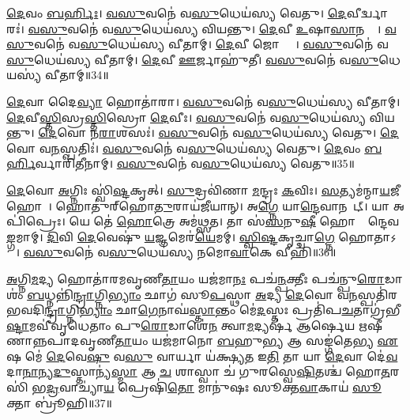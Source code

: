 \ul{𑌦𑍇}𑌵𑌂 \ul{𑌬}\ul{𑌰𑍍}𑌹𑌿𑌃।
\ul{𑌵}\ul{𑌸𑍁}𑌵𑌨𑍇॑ 𑌵\ul{𑌸𑍁}𑌧𑍇𑌯॑𑌸𑍍𑌯 𑌵𑍇𑌤𑍁।
\ul{𑌦𑍇}𑌵𑍀𑌰𑍍𑌦𑍍𑌵𑌾𑌰𑌃॑।
\ul{𑌵}\ul{𑌸𑍁}𑌵𑌨𑍇॑ 𑌵\ul{𑌸𑍁}𑌧𑍇𑌯॑𑌸𑍍𑌯 𑌵𑌿𑌯𑌨𑍍𑌤𑍁।
\ul{𑌦𑍇}𑌵𑍀 \ul{𑌉}𑌷𑌾\ul{𑌸𑌾}𑌨𑌕𑍍𑌤𑌾᳚।
\ul{𑌵}\ul{𑌸𑍁}𑌵𑌨𑍇॑ 𑌵\ul{𑌸𑍁}𑌧𑍇𑌯॑𑌸𑍍𑌯 𑌵𑍀𑌤𑌾𑌮𑍍।
\ul{𑌦𑍇}𑌵𑍀 𑌜𑍋𑌷𑍍𑌟𑍍𑌰𑍀᳚।
\ul{𑌵}\ul{𑌸𑍁}𑌵𑌨𑍇॑ 𑌵\ul{𑌸𑍁}𑌧𑍇𑌯॑𑌸𑍍𑌯 𑌵𑍀𑌤𑌾𑌮𑍍।
\ul{𑌦𑍇}𑌵𑍀 \ul{𑌊}𑌰𑍍𑌜𑌾𑌹𑍁॑𑌤𑍀।
\ul{𑌵}\ul{𑌸𑍁}𑌵𑌨𑍇॑ 𑌵\ul{𑌸𑍁}𑌧𑍇𑌯𑌸𑍍𑌯॑ 𑌵𑍀𑌤𑌾𑌮𑍍॥34॥

\ul{𑌦𑍇}𑌵𑌾 𑌦𑍈\ul{𑌵𑍍𑌯𑌾} 𑌹𑍋𑌤𑌾॑𑌰𑌾।
\ul{𑌵}\ul{𑌸𑍁}𑌵𑌨𑍇॑ 𑌵\ul{𑌸𑍁}𑌧𑍇𑌯॑𑌸𑍍𑌯 𑌵𑍀𑌤𑌾𑌮𑍍।
\ul{𑌦𑍇}𑌵𑍀\ul{𑌸𑍍𑌤𑌿}𑌸𑍍𑌰\ul{𑌸𑍍𑌤𑌿}𑌸𑍍𑌰𑍋 \ul{𑌦𑍇}𑌵𑍀𑌃।
\ul{𑌵}\ul{𑌸𑍁}𑌵𑌨𑍇॑ 𑌵\ul{𑌸𑍁}𑌧𑍇𑌯॑𑌸𑍍𑌯 𑌵𑌿𑌯𑌨𑍍𑌤𑍁।
\ul{𑌦𑍇}𑌵𑍋 𑌨\ul{𑌰𑌾}𑌶𑌸𑌃॑।
\ul{𑌵}\ul{𑌸𑍁}𑌵𑌨𑍇॑ 𑌵\ul{𑌸𑍁}𑌧𑍇𑌯॑𑌸𑍍𑌯 𑌵𑍇𑌤𑍁।
\ul{𑌦𑍇}𑌵𑍋 𑌵\ul{𑌨}𑌸𑍍𑌪𑌤𑌿𑌃॑।
\ul{𑌵}\ul{𑌸𑍁}𑌵𑌨𑍇॑ 𑌵\ul{𑌸𑍁}𑌧𑍇𑌯॑𑌸𑍍𑌯 𑌵𑍇𑌤𑍁।
\ul{𑌦𑍇}𑌵𑌂 \ul{𑌬}\ul{𑌰𑍍}𑌹𑌿𑌰𑍍𑌵𑌾𑌰𑌿॑𑌤𑍀𑌨𑌾𑌮𑍍।
\ul{𑌵}\ul{𑌸𑍁}𑌵𑌨𑍇॑ 𑌵\ul{𑌸𑍁}𑌧𑍇𑌯॑𑌸𑍍𑌯 𑌵𑍇𑌤𑍁॥35॥

\ul{𑌦𑍇}𑌵𑍋 \ul{𑌅}𑌗𑍍𑌨𑌿𑌃 𑌸𑍍𑌵𑌿॑\ul{𑌷𑍍𑌟}𑌕𑍃𑌤𑍍।
\ul{𑌸𑍁}𑌦𑍍𑌰𑌵𑌿॑𑌣𑌾 \ul{𑌮}𑌨𑍍𑌦𑍍𑌰𑌃 \ul{𑌕}𑌵𑌿𑌃।
\ul{𑌸}𑌤𑍍𑌯𑌮॑𑌨𑍍𑌮𑌾\ul{𑌯}𑌜𑍀 𑌹𑍋𑌤𑌾᳚।
𑌹𑍋𑌤𑍁॑𑌰𑍍‌\mbox{}𑌹𑍋\ul{𑌤𑍁}𑌰𑌾𑌯॑𑌜𑍀𑌯𑌾𑌨𑍍।
𑌅\ul{𑌗𑍍𑌨𑍇} 𑌯𑌾\ul{𑌨𑍍𑌦𑍇}𑌵𑌾𑌨𑌯𑌾᳚𑌟𑍍।
𑌯𑌾 𑌅𑌪𑌿॑𑌪𑍍𑌰𑍇𑌃।
𑌯𑍇 𑌤𑍇॑ \ul{𑌹𑍋}𑌤𑍍𑌰𑍇 𑌅𑌮॑𑌥𑍍𑌸𑌤।
𑌤𑌾 𑌸॑\ul{𑌸}𑌨𑍁\ul{𑌷𑍀}\ul{} 𑌹𑍋𑌤𑍍𑌰𑌾᳚𑌨𑍍𑌦𑍇𑌵\ul{𑌙𑍍𑌗}𑌮𑌾𑌮𑍍।
\ul{𑌦𑌿}𑌵𑌿 \ul{𑌦𑍇}𑌵𑍇𑌷𑍁॑ \ul{𑌯}𑌜𑍍𑌞𑌮𑍇𑌰॑\ul{𑌯𑍇}𑌮𑌮𑍍।
\ul{𑌸𑍍𑌵𑌿}\ul{𑌷𑍍𑌟}𑌕𑍃𑌚𑍍𑌚𑌾\ul{𑌗𑍍𑌨𑍇} 𑌹𑍋𑌤𑌾\-𑌽𑌭𑍂𑌃᳚।
\ul{𑌵}\ul{𑌸𑍁}𑌵𑌨𑍇॑ 𑌵\ul{𑌸𑍁}𑌧𑍇𑌯॑𑌸𑍍𑌯 𑌨𑌮𑍋\ul{𑌵𑌾}𑌕𑍇 𑌵𑍀𑌹𑌿॑॥36॥\anuvakamend[\ul{𑌵𑍀}\ul{𑌤𑌾𑌂} \ul{𑌵𑍇}𑌤𑍍𑌵\ul{𑌭𑍂}𑌰𑍇𑌕𑌂॑ 𑌚]

\ul{𑌅}𑌗𑍍𑌨𑌿\ul{𑌮}𑌦𑍍𑌯 𑌹𑍋𑌤𑌾॑𑌰𑌮𑌵𑍃𑌣𑍀\ul{𑌤𑌾}𑌯𑌂 𑌯𑌜॑𑌮𑌾\ul{𑌨𑌃} 𑌪𑌚॑\ul{𑌨𑍍𑌪}𑌕𑍍𑌤𑍀𑌃 𑌪𑌚॑𑌨𑍍𑌪𑍁\ul{𑌰𑍋}𑌡𑌾𑌶𑌂॑ \ul{𑌬}𑌧𑍍𑌨𑌨𑍍𑌨𑌿॑\ul{𑌨𑍍𑌦𑍍𑌰𑌾}𑌗𑍍𑌨𑌿\ul{𑌭𑍍𑌯𑌾𑌂} 𑌛𑌾𑌗॑ 𑌸𑍂\ul{𑌪}𑌸𑍍𑌥𑌾 \ul{𑌅}𑌦𑍍𑌯 \ul{𑌦𑍇}𑌵𑍋 𑌵\ul{𑌨}𑌸𑍍𑌪𑌤𑌿॑𑌰𑌭𑌵𑌦𑌿\ul{𑌨𑍍𑌦𑍍𑌰𑌾}𑌗𑍍𑌨𑌿\ul{𑌭𑍍𑌯𑌾𑌂} 𑌛𑌾\ul{𑌗𑍇}𑌨𑌾𑌘॑\ul{𑌸𑍍𑌤𑌾}𑌨𑍍𑌤𑌂 𑌮𑍇॑\ul{𑌦}𑌸𑍍𑌤𑌃 𑌪𑍍𑌰𑌤𑌿॑\-𑌪\ul{𑌚}𑌤𑌾𑌗𑍍𑌰॑𑌭𑍀\ul{𑌷𑍍𑌟𑌾}𑌮𑌵𑍀॑𑌵𑍃𑌧𑍇𑌤𑌾𑌂 𑌪𑍁\ul{𑌰𑍋}𑌡𑌾𑌶𑍇॑\ul{𑌨} 𑌤𑍍𑌵𑌾\ul{𑌮}𑌦𑍍𑌯𑌰𑍍\mbox{}𑌷॑ 𑌆𑌰𑍍\mbox{}𑌷𑍇𑌯 𑌋𑌷𑍀𑌣𑌾𑌨𑍍𑌨𑌪𑌾𑌦𑌵𑍃𑌣𑍀\ul{𑌤𑌾}𑌯𑌂 𑌯𑌜॑𑌮𑌾𑌨𑍋 \ul{𑌬}𑌹𑍁\ul{𑌭𑍍𑌯} 𑌆 𑌸𑌙𑍍𑌗॑𑌤𑍇𑌭𑍍𑌯 \ul{𑌏}𑌷 𑌮𑍇॑ \ul{𑌦𑍇}𑌵𑍇\ul{𑌷𑍁} 𑌵\ul{𑌸𑍁} 𑌵𑌾𑌰𑍍𑌯𑌾 𑌯॑𑌕𑍍𑌷𑍍𑌯\ul{𑌤} 𑌇\ul{𑌤𑌿} 𑌤𑌾 𑌯𑌾 \ul{𑌦𑍇}𑌵𑌾 𑌦𑍇॑\ul{𑌵}𑌦𑌾\ul{𑌨𑌾}𑌨𑍍𑌯\ul{𑌦𑍁}𑌸𑍍𑌤𑌾𑌨𑍍𑌯॑\ul{𑌸𑍍𑌮𑌾} 𑌆 \ul{𑌚} 𑌶𑌾𑌸𑍍𑌵𑌾 𑌚॑ 𑌗𑍁𑌰𑌸𑍍𑌵𑍇\ul{𑌷𑌿}𑌤𑌶𑍍𑌚॑ 𑌹𑍋\ul{𑌤}𑌰𑌸𑌿॑ 𑌭\ul{𑌦𑍍𑌰}𑌵𑌾𑌚𑍍𑌯𑌾॑\ul{𑌯} 𑌪𑍍𑌰𑍇𑌷𑌿॑\ul{𑌤𑍋} 𑌮𑌾𑌨𑍁॑𑌷𑌃 𑌸𑍂𑌕𑍍𑌤\ul{𑌵𑌾}𑌕𑌾𑌯॑ \ul{𑌸𑍂}𑌕𑍍𑌤𑌾 𑌬𑍍𑌰𑍂॑𑌹𑌿॥37॥\anuvakamend[\ul{𑌅}𑌗𑍍𑌨𑌿\ul{𑌮}𑌦𑍍𑌯𑍈𑌕𑌮𑍍᳚]






\clearpage
{}
\setcounter{anuvakam}{0}

